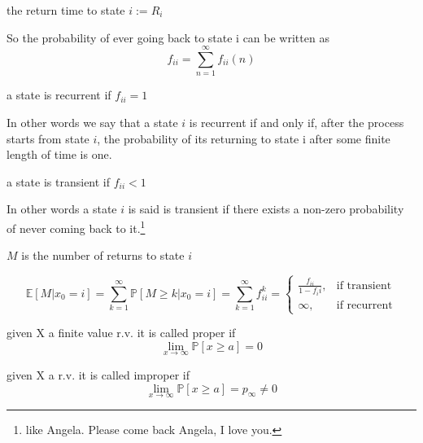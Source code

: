 \begin{definition}
the return time to state $i := R_i$
\end{definition}

So the probability of ever going back to state i can be written as
$$f_{ii} = \sum_{n=1}^\infty f_{ii}(n) $$

\begin{definition}
a state is recurrent if $f_{ii} = 1$
\end{definition}
	In other words we say that a state $i$ is recurrent if and only if, after the process starts from state $i$, the probability of its returning to state i after some finite length of time is one.
	
\begin{definition}
	a state is transient if  $f_{ii} < 1$
\end{definition}
	In other words a state $i$ is said is transient if there exists a non-zero probability of never coming back to it.\footnote{like Angela. Please come back Angela, I love you.}

\begin{definition}
$M$ is the number of returns to state $i$
\end{definition}

$$\mathbb{E}[M | x_0 = i] = \sum_{k=1}^\infty \mathbb{P}[M\geq k | x_0 = i] = \sum_{k=1}^\infty f_{ii}^k = \begin{cases}
\frac{f_{ii}}{1-f_ii}, & \mbox{if transient} \\
\infty, & \mbox{if recurrent}
\end{cases}$$

\begin{definition}[Proper r.v]
given X a finite value r.v. it is called proper if $$\lim_{x\to \infty} \mathbb{P}[x\geq a] = 0$$
\end{definition}

\begin{definition}[Improper r.v]
given X a r.v. it is called improper if  $$\lim_{x\to \infty} \mathbb{P}[x\geq a] = p_\infty \ne 0$$
\end{definition}


